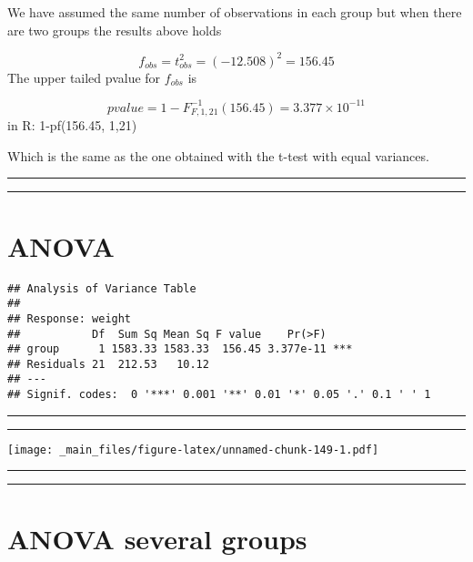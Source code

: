 \documentclass[
]{book}
\begin{document}
We have assumed the same number of observations in each group but when there are two groups the results above holds

\[f_{obs}=t_{obs}^2=(−12.508)^2=156.45\]
The upper tailed pvalue for \(f_{obs}\) is

\[pvalue=1-F^{-1}_{F,1,21}(156.45)=3.377 \times 10^{-11}\]
in R: 1-pf(156.45, 1,21)

Which is the same as the one obtained with the t-test with equal variances.

\begin{center}\rule{0.5\linewidth}{0.5pt}\end{center}

\begin{center}\rule{0.5\linewidth}{0.5pt}\end{center}

\hypertarget{anova-2}{%
\section{ANOVA}\label{anova-2}}

\begin{verbatim}
## Analysis of Variance Table
## 
## Response: weight
##           Df  Sum Sq Mean Sq F value    Pr(>F)    
## group      1 1583.33 1583.33  156.45 3.377e-11 ***
## Residuals 21  212.53   10.12                      
## ---
## Signif. codes:  0 '***' 0.001 '**' 0.01 '*' 0.05 '.' 0.1 ' ' 1
\end{verbatim}

\begin{center}\rule{0.5\linewidth}{0.5pt}\end{center}

\begin{center}\rule{0.5\linewidth}{0.5pt}\end{center}

\texttt{[image: \_main\_files/figure-latex/unnamed-chunk-149-1.pdf]}

\begin{center}\rule{0.5\linewidth}{0.5pt}\end{center}

\begin{center}\rule{0.5\linewidth}{0.5pt}\end{center}

\hypertarget{anova-several-groups}{%
\section{ANOVA several groups}\label{anova-several-groups}}
\end{document}

